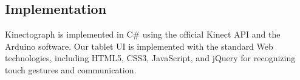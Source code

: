 \subsection{Implementation}
Kinectograph is implemented in C\# using the official Kinect API and the Arduino software. Our tablet UI is implemented with the standard Web technologies, including HTML5, CSS3, JavaScript, and jQuery for recognizing touch gestures and communication.
